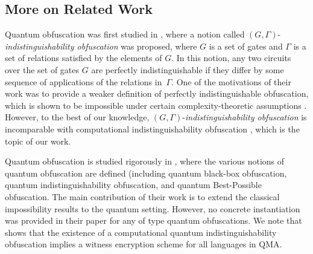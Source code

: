 \subsection{More on Related Work}
\label{sec:obf-quantum}
Quantum obfuscation was first studied in \cite{AJJ14}, where a notion called
$(G,\Gamma)$-{\em indistinguishability obfuscation} was proposed,  where $G$ is a set of gates and $\Gamma$ is a set of relations satisfied by the elements of $G$. In this notion, any two circuits over the set of gates $G$ are perfectly indistinguishable if they differ by some sequence of applications of the relations in~$\Gamma.$ One of the motivations of their work was to provide a weaker definition of perfectly indistinguishable obfuscation, which is shown to be impossible under certain complexity-theoretic assumptions \cite{AJJ14}. However, to the best of our knowledge, $(G,\Gamma)$-{\em indistinguishability obfuscation} is  incomparable with  computational indistinguishability obfuscation \cite{BGI+12, GGH+13}, which is the topic of our work.

Quantum obfuscation is studied rigorously in \cite{AF16arxiv}, where the various notions of quantum obfuscation are defined (including quantum black-box obfuscation, quantum indistinguishability obfuscation, and quantum Best-Possible obfuscation. 
%
 The main contribution of their work is to extend the classical impossibility results to the quantum setting.
 However, no concrete instantiation was provided in their paper for any of type quantum obfuscations. 
  We note that  \cite{AF16arxiv} shows that the existence of a computational quantum indistinguishability obfuscation implies a witness encryption scheme for all languages in \textsf{QMA}.


%
%


